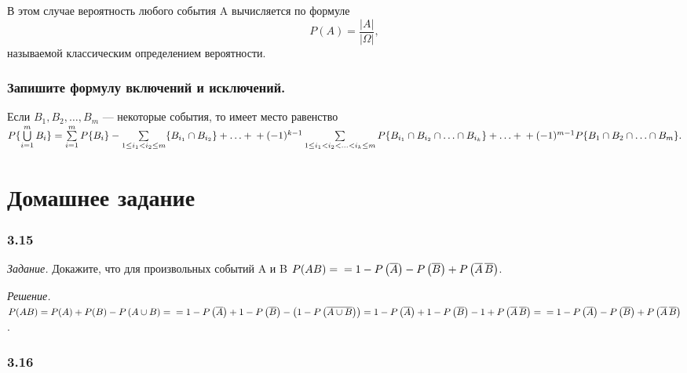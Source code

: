 \documentclass{book}
\begin{document}
В этом случае вероятность любого события A вычисляется по формуле
$$ P(A) =
\frac{ |A| }{ |\Omega| },$$
называемой классическим определением вероятности.

\subsubsection*{Запишите формулу включений и исключений.}

Если
$ B_1, B_2,  \dotsc , B_m $ --- некоторые события, то имеет место равенство
$ P\{ \bigcup \limits_{i=1}^m B_i \} =
\sum \limits_{i=1}^m P \{ B_i \} -
\sum \limits_{ 1 \leq i_1 < i_2 \leq m } \{ B_{ i_1 } \cap B_{ i_2 } \} + \dotsc + \\
+ (-1)^{k-1} \sum \limits_{ 1 \leq i_1 < i_2 < \dotsc < i_k \leq m } P \{ B_{ i_1 } \cap B_{ i_2 } \cap \dotsc \cap B_{ i_k } \} + \dotsc + \\
+ (-1)^{m-1} P \{ B_1 \cap B_2 \cap \dotsc \cap B_m \}.$

\section*{Домашнее задание}

\subsubsection*{3.15}

\textit{Задание.} Докажите, что для произвольных событий A и B
$ P( AB ) = \\
= 1 - P\left( \overline{ A } \right) - P \left( \overline{ B } \right) + P \left( \overline{ A } \, \overline{ B } \right) $.

\textit{Решение.}
$ P( AB ) =
P(A) + P(B) - P \left( A \cup B \right) = \\
= 1 - P \left( \overline{ A }\right) + 1 - P \left( \overline{ B } \right) - \left( 1 - P \left( \overline{ A \cup B } \right) \right) =
1 - P \left( \overline{ A } \right) + 1 - P \left( \overline{ B } \right) - 1 + P \left( \overline{ A } \, \overline{ B } \right) = \\
= 1 - P \left( \overline{ A } \right) - P \left( \overline{ B } \right) + P \left( \overline{ A } \, \overline{ B } \right) $.

\subsubsection*{3.16}
\end{document}
